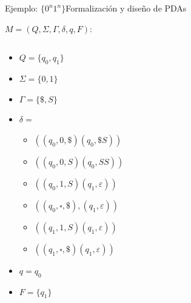 \documentclass[spanish]{beamer}
\begin{document}
\begin{frame}{Ejemplo: $\{0^n1^n\}$}{Formalización y diseño de PDAs}

    $M = (Q, \Sigma, \Gamma, \delta, q, F)$:

    \begin{columns}
        \begin{column}{0.4\textwidth}
            \begin{itemize}
                \item $Q = \{q_0, q_1\}$
                \item $\Sigma = \{0, 1\}$
                \item $\Gamma = \{\$, S\}$
                \item $\delta =$
                \begin{itemize}
                    \item $((q_0,0,\$)(q_0,\$S))$
                    \item $((q_0,0,S)(q_0,SS))$
                    \item $((q_0,1,S)(q_1,\varepsilon))$
                    \item $((q_0,\square,\$),(q_1,\varepsilon))$
                    \item $((q_1,1,S)(q_1,\varepsilon))$
                    \item $((q_1,\square,\$)(q_1,\varepsilon))$
                \end{itemize}
                \item $q = q_0$
                \item $F = \{q_1\}$
            \end{itemize}
        \end{column}
        \begin{column}{0.6\textwidth}
        \end{column}
    \end{columns}
\end{frame}
\end{document}
